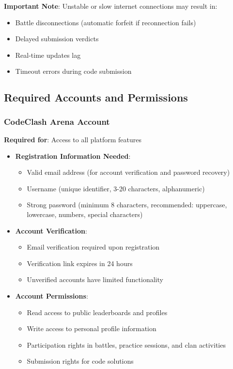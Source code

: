 \documentclass[12pt]{article}
\begin{document}
\textbf{Important Note}: Unstable or slow internet connections may result in:
\begin{itemize}
\item Battle disconnections (automatic forfeit if reconnection fails)
\item Delayed submission verdicts
\item Real-time updates lag
\item Timeout errors during code submission
\end{itemize}

\subsection{Required Accounts and Permissions}

\subsubsection{CodeClash Arena Account}

\textbf{Required for}: Access to all platform features

\begin{itemize}
\item \textbf{Registration Information Needed}:
  \begin{itemize}
    \item Valid email address (for account verification and password recovery)
    \item Username (unique identifier, 3-20 characters, alphanumeric)
    \item Strong password (minimum 8 characters, recommended: uppercase, lowercase, numbers, special characters)
  \end{itemize}
\item \textbf{Account Verification}:
  \begin{itemize}
    \item Email verification required upon registration
    \item Verification link expires in 24 hours
    \item Unverified accounts have limited functionality
  \end{itemize}
\item \textbf{Account Permissions}:
  \begin{itemize}
    \item Read access to public leaderboards and profiles
    \item Write access to personal profile information
    \item Participation rights in battles, practice sessions, and clan activities
    \item Submission rights for code solutions
  \end{itemize}
\end{itemize}
\end{document}
